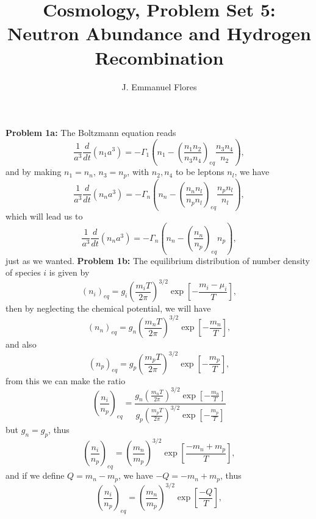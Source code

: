 \documentclass[11pt]{article}
\title{Cosmology, Problem Set 5: Neutron Abundance and Hydrogen Recombination}
\author{J. Emmanuel Flores}
\begin{document}
\maketitle
\textbf{Problem 1a:}
The Boltzmann equation reads 
\begin{displaymath}
  \frac{1}{a^3}\frac{d}{dt}(n_1 a^3) =-\Gamma_1 \left( n_1 -\left(\frac{n_1 n_2}{n_3 n_4}\right)_{eq} \frac{n_3 n_4}{n_2}\right),
\end{displaymath}
and by making $n_1 = n_n$, $n_3 = n_p$, with $n_2, n_4$ to be leptons $n_l$, we have
\begin{displaymath}
  \frac{1}{a^3}\frac{d}{dt}(n_n a^3) =-\Gamma_n \left( n_n -\left(\frac{n_n n_l}{n_p n_l}\right)_{eq} \frac{n_p n_l}{n_l}\right),
\end{displaymath}
which will lead us to
\begin{displaymath}
  \frac{1}{a^3}\frac{d}{dt}(n_n a^3) = -\Gamma_n \left( n_n -\left(\frac{n_n}{n_p}\right)_{eq} n_p\right),
\end{displaymath}
just as we wanted.
\newline
\textbf{Problem 1b:}
The equilibrium distribution of number density of species $i$ is given by 
\begin{displaymath}
  (n_i)_{eq} = g_{i}\left(\frac{m_i T}{2\pi}\right)^{3/2} \exp{\left[-\frac{m_i-\mu_i}{T}\right]},
\end{displaymath}
then by neglecting the chemical potential, we will have 
\begin{displaymath}
  (n_n)_{eq} = g_{n}\left(\frac{m_n T}{2\pi}\right)^{3/2} \exp{\left[-\frac{m_n}{T}\right]},
\end{displaymath}
and also
\begin{displaymath}
  (n_p)_{eq} = g_{p}\left(\frac{m_p T}{2\pi}\right)^{3/2} \exp{\left[-\frac{m_p}{T}\right]},
\end{displaymath}
from this we can make the ratio
\begin{displaymath}
  \left(\frac{n_i}{n_p}\right)_{eq} = \frac{g_{n}\left(\frac{m_n T}{2\pi}\right)^{3/2} \exp{\left[-\frac{m_n}{T}\right]}}{g_{p}\left(\frac{m_p T}{2\pi}\right)^{3/2} \exp{\left[-\frac{m_p}{T}\right]}}
\end{displaymath}
but $g_n = g_p$, thus
\begin{displaymath}
  \left(\frac{n_i}{n_p}\right)_{eq} = \left(\frac{m_n}{m_p}\right)^{3/2}\exp{\left[\frac{-m_n + m_p}{T}\right]},
\end{displaymath}
and if we define $Q = m_n-m_p$, we have $-Q = -m_n+m_p$, thus
\begin{displaymath}
  \left(\frac{n_i}{n_p}\right)_{eq} = \left(\frac{m_n}{m_p}\right)^{3/2}\exp{\left[\frac{-Q}{T}\right]},
\end{displaymath}
\end{document}
